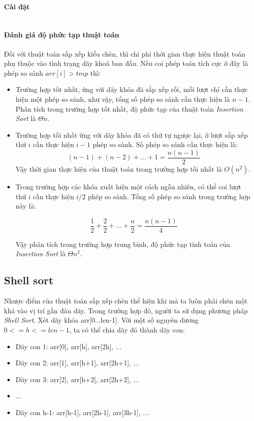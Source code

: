\documentclass[a4paper,12pt]{report}
\newcommand{\mnt}[1]{\inputminted[frame=single, linenos=true, tabsize=4]{c++}{#1}}
\begin{document}
\paragraph{Cài đặt}
\mnt{src/insertionsort.cpp}

\paragraph{Đánh giá độ phức tạp thuật toán}
Đối với thuật toán sắp xếp kiểu chèn, thì chi phí thời gian thực hiện thuật toán phụ thuộc vào
tình trạng dãy khoá ban đầu. Nếu coi phép toán tích cực ở đây là phép so sánh $arr[i] > tmp$ thì:

\begin{itemize}
\item Trường hợp tốt nhất, ứng với dãy khóa đã sắp xếp rồi, mỗi lượt chỉ cần thực hiện một phép so sánh, như vậy, tổng số phép so sánh cần thực hiện là $n-1$. Phân tích trong trường hợp tốt nhất, độ phức tạp của thuật toán \emph{Insertion Sort} là $\Theta{n}$.
\item Trường hợp tồi nhất ứng với dãy khóa đã có thứ tự ngược lại, ở lượt sắp xếp thứ $i$ cần thực hiện $i-1$ phép so sánh. Số phép so sánh cần thực hiện là:
$$(n-1) + (n-2) + ... +1 = \frac{n(n-1)}{2}$$
Vậy thời gian thực hiện của thuật toán trong trường hợp tồi nhất là $O(n^2)$.
\item Trong trường hợp các khóa xuất hiện một cách ngẫu nhiên, có thể coi lượt thứ $i$ cần thực hiện $i/2$ phép so sánh. Tổng số phép so sánh trong trường hợp này là:

$$\frac{1}{2} + \frac{2}{2} + ... + \frac{n}{2} = \frac{n(n-1)}{4}$$

Vậy phân tích trong trường hợp trung bình, độ phức tạp tính toán của \emph{Insertion Sort} là $\Theta{n^2}$.

\end{itemize}



\subsection{Shell sort}

Nhược điểm của thuật toán sắp xếp chèn thể hiện khi mà ta luôn phải chèn một khá vào vị trí gần đàu dãy. Trong trường hợp đó, người ta sử dụng phương pháp \emph{Shell Sort}. Xét dãy khóa arr[0...len-1]. Với một số nguyên dương $0 <= h <= len-1$, ta có thể chia dãy đó thành dãy con:
\begin{itemize}
\item Dãy con 1: arr[0], arr[h], arr[2h], ...
\item Dãy con 2: arr[1], arr[h+1], arr[2h+1], ...
\item Dãy con 3: arr[2], arr[h+2], arr[2h+2], ...
\item ...
\item Dãy con h-1: arr[h-1], arr[2h-1], arr[3h-1], ...
\end{itemize}
\end{document}
